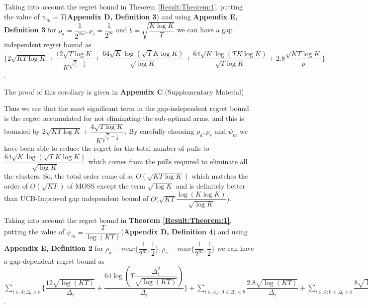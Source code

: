 \begin{corollary}
\label{Result:Corollary:1}
Taking into account the regret bound in Theorem \ref{Result:Theorem:1}, putting the value of $\psi_{m}=T$(\textbf{Appendix D, Definition 3}) and using \textbf{Appendix E, Definition 3} for $\rho_{a}=\dfrac{1}{2^{2m}},\rho_{s}=\dfrac{1}{2^{m}} $ and $b=\sqrt{\dfrac{K\log K}{T}}$ we can have a gap independent regret bound as $\bigg\lbrace 2\sqrt{KT\log K} + \dfrac{12\sqrt{T\log K}}{K^{\sqrt{\frac{T}{e}}-\frac{1}{2}}} + \dfrac{64\sqrt{K}\log{(\sqrt{T}K\log K)}}{\sqrt{\log K}} + \dfrac{64\sqrt{K}\log{(TK\log K)}}{\sqrt{T\log K}} + 2.8\dfrac{\sqrt{KT\log K}}{p} \bigg\rbrace$.
\end{corollary}


	The proof of this corollary is given in \textbf{Appendix C}.(Supplementary Material)

\begin{remark}
\label{Result:Rem:3}
	Thus we see that the most significant term in the gap-independent regret bound is the regret accumulated for not eliminating the sub-optimal arms, and this is bounded by $2\sqrt{KT\log K} + \dfrac{4\sqrt{T\log K}}{K^{\sqrt{\frac{T}{e}}-\frac{1}{2}}}$. By carefully choosing $\rho_{a},\rho_{s}$ and $\psi_{m}$ we have been able to reduce the regret for the total number of pulls to $\dfrac{64\sqrt{K}\log{(\sqrt{T}K\log K)}}{\sqrt{\log K}}$ which comes from the pulls required to eliminate all the clusters. So, the total order come of as $O(\sqrt{KT\log K})$ which matches the order of $O(\sqrt{KT})$ of MOSS except the term $\sqrt{\log K}$ and is definitely better than UCB-Improved gap independent bound of $O\big(\sqrt{KT}\dfrac{\log(K\log K)}{\sqrt{\log K}}\big)$.
\end{remark}

\begin{corollary}
\label{Result:Corollary:2}
Taking into account the regret bound in \textbf{Theorem \ref{Result:Theorem:1}}, putting the value of $\psi_{m}=\dfrac{T}{\log (KT)}$(\textbf{Appendix D, Definition 4}) and using \textbf{Appendix E, Definition 2} for $\rho_{a}=max\bigg\lbrace\dfrac{1}{2^{m}},\dfrac{1}{2}\bigg\rbrace,\rho_{s}=max\bigg\lbrace\dfrac{1}{2^{m}},\dfrac{1}{2}\bigg\rbrace $ we can have a gap dependent regret bound as $ \sum_{i\in A:\Delta_{i}\geq b}\bigg\lbrace\dfrac{12\sqrt{\log (KT)}}{\Delta_{i}}  + \dfrac{64\log{(T\dfrac{\Delta_{i}^{2}}{\sqrt{\log (KT)}})}}{\Delta_{i}}\bigg\rbrace + \sum\limits_{i\in A_{s^{*}}:0\leq\Delta_{i}\leq b}\dfrac{2.8\sqrt{\log (KT)}}{\Delta_{i}} + \sum\limits_{i\in A:0\leq\Delta_{i}\leq b}\dfrac{8\sqrt{\log (KT)}}{\Delta_{i}}$.
\end{corollary}

